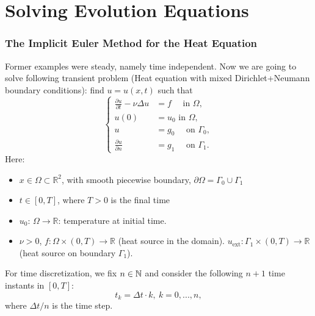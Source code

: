 \documentclass[12pt]{article}
\newcommand{\R}{{\mathbb R}}
\begin{document}
\section{Solving Evolution Equations}
\label{sec:solv-evol-equat}

\subsubsection{The Implicit Euler Method for the Heat Equation}
\label{sec:heat-equation}
\newcommand{\deltaT}{\Delta t}

Former examples were steady, namely time independent. Now we are going
to solve following transient problem (Heat equation with mixed
Dirichlet+Neumann boundary conditions): find $u=u(x,t)$ such that
\begin{equation}
  \label{eq:heat equation}
  \left\{
    \begin{aligned}
      \frac{\partial u}{\partial t} -\nu\Delta u &= f \quad \text{ in } \Omega, \\
      u(0)&=u_0 \text{ in } \Omega, \\
      u &= g_0 \quad \text{ on } \Gamma_0, \\
      \frac{\partial u}{\partial n} &= g_1 \quad \text{ on } \Gamma_1.
    \end{aligned}
    \right.
\end{equation}
Here:
\begin{itemize}
\item $x\in\Omega\subset\R^2$, with smooth piecewise boundary,  $\partial\Omega=\Gamma_0\cup\Gamma_1$
\item $t\in [0,T]$, where $T>0$ is the final time
\item $u_0$: $\Omega\to\R$: temperature at initial time.
\item $\nu>0$, $f:\Omega\times(0,T)\to\R$ (heat source in the domain).
  $u_{\text{ext}}:\Gamma_1\times(0,T)\to\R$ (heat source on boundary $\Gamma_1$).
\end{itemize}

For time discretization, we fix $n\in{\mathbb N}$ and consider the
following $n+1$ time instants in $[0,T]$:
$$t_k= \deltaT\cdot k, \ k=0, ..., n,$$
where $\deltaT/n$ is the time step.
\end{document}
